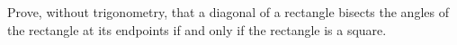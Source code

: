 Prove, without trigonometry, that a diagonal of a rectangle bisects the angles of the rectangle at its endpoints if and only if the rectangle is a square.
